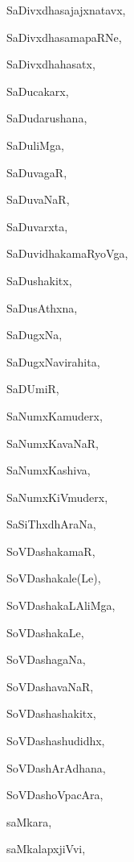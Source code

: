 \begin{multicols}{2}
{SaDivxdhasajajxnatavx}, \pageref{SaDivxdhasajajxnatavx}

{SaDivxdhasamapaRNe}, \pageref{SaDivxdhasamapaRNe}

{SaDivxdhahasatx}, \pageref{SaDivxdhahasatx}

{SaDucakarx}, \pageref{SaDucakarx}

{SaDudarushana}, \pageref{SaDudarushana}

{SaDuliMga}, \pageref{SaDuliMga}

{SaDuvagaR}, \pageref{SaDuvagaR}

{SaDuvaNaR}, \pageref{SaDuvaNaR}

{SaDuvarxta}, \pageref{SaDuvarxta}

{SaDuvidhakamaRyoVga}, \pageref{SaDuvidhakamaRyoVga}

{SaDushakitx}, \pageref{SaDushakitx}

{SaDusAthxna}, \pageref{SaDusAthxna}

{SaDugxNa}, \pageref{SaDugxNa}

{SaDugxNavirahita}, \pageref{SaDugxNavirahita}

{SaDUmiR}, \pageref{SaDUmiR}

{SaNumxKamuderx}, \pageref{SaNumxKamuderx}

{SaNumxKavaNaR}, \pageref{SaNumxKavaNaR}

{SaNumxKashiva}, \pageref{SaNumxKashiva}

{SaNumxKiVmuderx}, \pageref{SaNumxKiVmuderx}

{SaSiThxdhAraNa}, \pageref{SaSiThxdhAraNa}

{SoVDashakamaR}, \pageref{SoVDashakamaR}

{SoVDashakale(Le)}, \pageref{SoVDashakaleLe}

{SoVDashakaLAliMga}, \pageref{SoVDashakaLAliMga}

{SoVDashakaLe}, \pageref{SoVDashakaLe}

{SoVDashagaNa}, \pageref{SoVDashagaNa}

{SoVDashavaNaR}, \pageref{SoVDashavaNaR}

{SoVDashashakitx}, \pageref{SoVDashashakitx}

{SoVDashashudidhx}, \pageref{SoVDashashudidhx}

{SoVDashArAdhana}, \pageref{SoVDashArAdhana}

{SoVDashoVpacAra}, \pageref{SoVDashoVpacAra}

{saMkara}, \pageref{saMkara}

{saMkalapxjiVvi}, \pageref{saMkalapxjiVvi}


\end{multicols}
